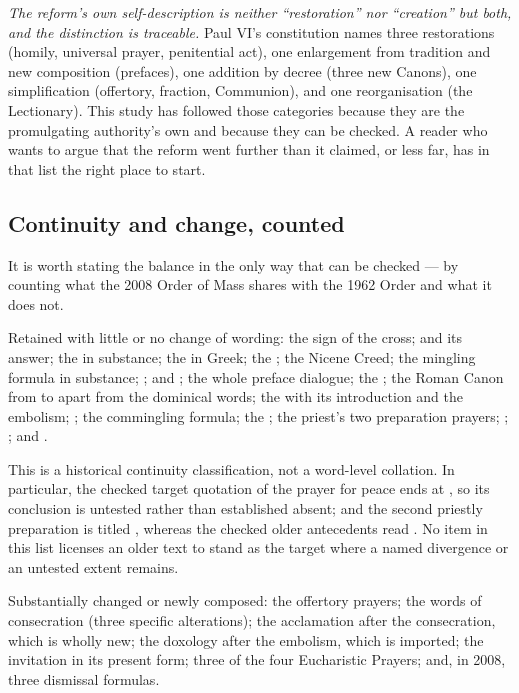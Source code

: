 \emph{The reform's own self-description is neither ``restoration'' nor ``creation'' but both,
and the distinction is traceable.} Paul VI's constitution names three restorations (homily,
universal prayer, penitential act), one enlargement from tradition and new composition
(prefaces), one addition by decree (three new Canons), one simplification (offertory, fraction,
Communion), and one reorganisation (the Lectionary). This study has followed those categories
because they are the promulgating authority's own and because they can be checked. A reader who
wants to argue that the reform went further than it claimed, or less far, has in that list the
right place to start.

\subsection{Continuity and change, counted}

It is worth stating the balance in the only way that can be checked --- by counting what the
2008 Order of Mass shares with the 1962 Order and what it does not.

Retained with little or no change of wording: the sign of the cross; 
and its answer; the  in substance; the  in Greek; the
; the Nicene Creed; the mingling formula in substance; ;  and ; the whole preface dialogue; the
; the Roman Canon from  to  apart from the
dominical words; the  with its introduction and the embolism; ; the commingling formula; the ; the priest's two preparation prayers;
; ;  and
.

This is a historical continuity classification, not a word-level collation. In particular,
the checked target quotation of the prayer for peace ends at , so its conclusion
is untested rather than established absent; and the second priestly preparation is titled
, whereas the checked older antecedents read
. No item in this list licenses an older text to stand as the
target where a named divergence or an untested extent remains.

Substantially changed or newly composed: the offertory prayers; the words of consecration (three
specific alterations); the acclamation after the consecration, which is wholly new; the
doxology after the embolism, which is imported; the invitation  in its
present form; three of the four Eucharistic Prayers; and, in 2008, three dismissal formulas.

